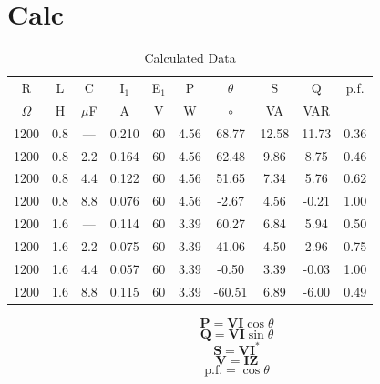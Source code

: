 \documentclass{article}
\begin{document}
\section{Calc}
\begin{table}[h]
  \begin{center}
    \begin{tabular}{cccccccccc}
      \hline
      R & L & C & I$_1$ & E$_1$ & P & $\theta$ & S & Q & p.f. \\
      $\Omega$ & H & $\mu$F & A & V & W & $\circ$ & VA & VAR & \\
      \hline
      1200 & 0.8 & --- & 0.210 & 60 & 4.56 &  68.77 & 12.58 & 11.73 & 0.36 \\
      1200 & 0.8 & 2.2 & 0.164 & 60 & 4.56 &  62.48 &  9.86 &  8.75 & 0.46 \\
      1200 & 0.8 & 4.4 & 0.122 & 60 & 4.56 &  51.65 &  7.34 &  5.76 & 0.62 \\
      1200 & 0.8 & 8.8 & 0.076 & 60 & 4.56 &  -2.67 &  4.56 & -0.21 & 1.00 \\
      1200 & 1.6 & --- & 0.114 & 60 & 3.39 &  60.27 &  6.84 &  5.94 & 0.50 \\
      1200 & 1.6 & 2.2 & 0.075 & 60 & 3.39 &  41.06 &  4.50 &  2.96 & 0.75 \\
      1200 & 1.6 & 4.4 & 0.057 & 60 & 3.39 &  -0.50 &  3.39 & -0.03 & 1.00 \\
      1200 & 1.6 & 8.8 & 0.115 & 60 & 3.39 & -60.51 &  6.89 & -6.00 & 0.49 \\
      \hline
    \end{tabular}
    \caption{Calculated Data}
    \label{tab:calc_data}
  \end{center}
\end{table}

\[\mathbf{P} = \mathbf{VI}\cos\theta \]
\[\mathbf{Q} = \mathbf{VI}\sin\theta\]
\[\mathbf{S} = \mathbf{VI}^*\]
\[\mathbf{V} = \mathbf{IZ}\]
\[\text{p.f.} = \cos\theta\]
\end{document}
